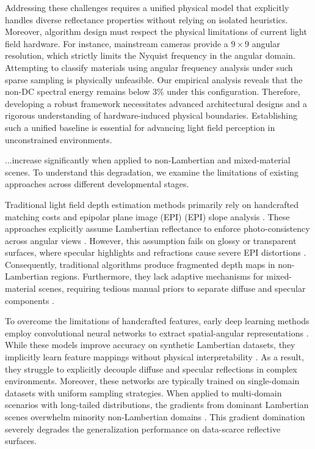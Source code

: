\documentclass[lettersize,journal]{IEEEtran}
\begin{document}
Addressing these challenges requires a unified physical model that explicitly handles diverse reflectance properties without relying on isolated heuristics. Moreover, algorithm design must respect the physical limitations of current light field hardware. For instance, mainstream cameras provide a $9 \times 9$ angular resolution, which strictly limits the Nyquist frequency in the angular domain. Attempting to classify materials using angular frequency analysis under such sparse sampling is physically unfeasible. Our empirical analysis reveals that the non-DC spectral energy remains below 3\% under this configuration. Therefore, developing a robust framework necessitates advanced architectural designs and a rigorous understanding of hardware-induced physical boundaries. Establishing such a unified baseline is essential for advancing light field perception in unconstrained environments.

...increase significantly when applied to non-Lambertian and mixed-material scenes. To understand this degradation, we examine the limitations of existing approaches across different developmental stages.

Traditional light field depth estimation methods primarily rely on handcrafted matching costs and epipolar plane image (EPI) (EPI) slope analysis \cite{learninglearn}. These approaches explicitly assume Lambertian reflectance to enforce photo-consistency across angular views \cite{lambertian}. However, this assumption fails on glossy or transparent surfaces, where specular highlights and refractions cause severe EPI distortions \cite{specularspecu_9}. Consequently, traditional algorithms produce fragmented depth maps in non-Lambertian regions. Furthermore, they lack adaptive mechanisms for mixed-material scenes, requiring tedious manual priors to separate diffuse and specular components \cite{manualmanua}.

To overcome the limitations of handcrafted features, early deep learning methods employ convolutional neural networks to extract spatial-angular representations \cite{epinetepine}. While these models improve accuracy on synthetic Lambertian datasets, they implicitly learn feature mappings without physical interpretability \cite{physicalphysi}. As a result, they struggle to explicitly decouple diffuse and specular reflections in complex environments. Moreover, these networks are typically trained on single-domain datasets with uniform sampling strategies. When applied to multi-domain scenarios with long-tailed distributions, the gradients from dominant Lambertian scenes overwhelm minority non-Lambertian domains \cite{longlong}. This gradient domination severely degrades the generalization performance on data-scarce reflective surfaces.
\end{document}
